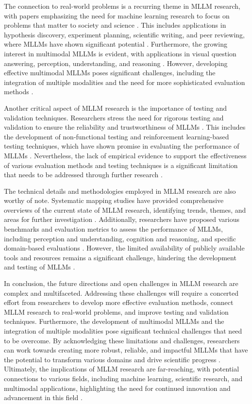 \documentclass[conference]{IEEEtran}
\begin{document}
The connection to real-world problems is a recurring theme in MLLM research, with papers emphasizing the need for machine learning research to focus on problems that matter to society and science \cite{b5}. This includes applications in hypothesis discovery, experiment planning, scientific writing, and peer reviewing, where MLLMs have shown significant potential \cite{b6}. Furthermore, the growing interest in multimodal MLLMs is evident, with applications in visual question answering, perception, understanding, and reasoning \cite{b7}. However, developing effective multimodal MLLMs poses significant challenges, including the integration of multiple modalities and the need for more sophisticated evaluation methods \cite{b8}.

Another critical aspect of MLLM research is the importance of testing and validation techniques. Researchers stress the need for rigorous testing and validation to ensure the reliability and trustworthiness of MLLMs \cite{b9}. This includes the development of non-functional testing and reinforcement learning-based testing techniques, which have shown promise in evaluating the performance of MLLMs \cite{b10}. Nevertheless, the lack of empirical evidence to support the effectiveness of various evaluation methods and testing techniques is a significant limitation that needs to be addressed through further research \cite{b11}.

The technical details and methodologies employed in MLLM research are also worthy of note. Systematic mapping studies have provided comprehensive overviews of the current state of MLLM research, identifying trends, themes, and areas for further investigation \cite{b12}. Additionally, researchers have proposed various benchmarks and evaluation metrics to assess the performance of MLLMs, including perception and understanding, cognition and reasoning, and specific domain-based evaluations \cite{b13}. However, the limited availability of publicly available tools and resources remains a significant challenge, hindering the development and testing of MLLMs \cite{b14}.

In conclusion, the future directions and open challenges in MLLM research are complex and multifaceted. Addressing these challenges will require a concerted effort from researchers to develop more effective evaluation methods, connect MLLM research to real-world problems, and improve testing and validation techniques. Furthermore, the development of multimodal MLLMs and the integration of multiple modalities pose significant technical challenges that need to be overcome. By acknowledging these limitations and challenges, researchers can work towards creating more robust, reliable, and impactful MLLMs that have the potential to transform various domains and drive scientific progress \cite{b15}. Ultimately, the implications of MLLM research are far-reaching, with potential connections to various fields, including machine learning, scientific research, and multimodal applications, highlighting the need for continued innovation and advancement in this field \cite{b16}.
\end{document}
